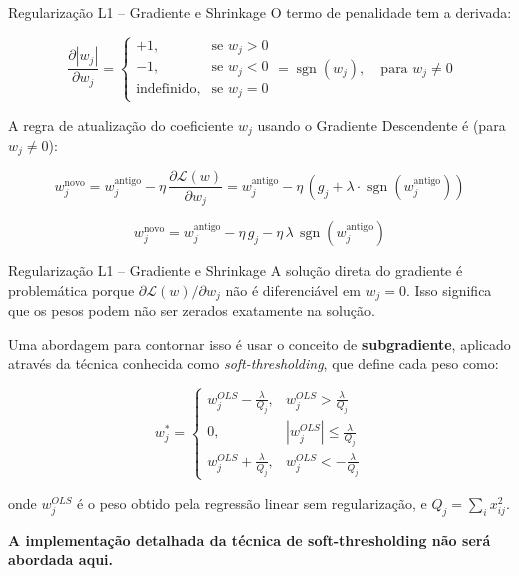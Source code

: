 \documentclass{beamer}
\begin{document}
\begin{frame}{Regularização L1 – Gradiente e Shrinkage}
O termo de penalidade tem a derivada:

\begin{equation}
\frac{\partial |w_j|}{\partial w_j} =
\begin{cases}
+1, & \text{se } w_j > 0 \\
-1, & \text{se } w_j < 0 \\
\text{indefinido}, & \text{se } w_j = 0
\end{cases}
= \operatorname{sgn}(w_j), \quad \text{para } w_j \ne 0
\end{equation}

A regra de atualização do coeficiente $w_j$ usando o Gradiente Descendente é (para $w_j \ne 0$):

\begin{equation}
w_j^{\text{novo}} = w_j^{\text{antigo}} - \eta \, \frac{\partial \mathcal{L}(w)}{\partial w_j}
= w_j^{\text{antigo}} - \eta \, (g_j + \lambda \cdot \operatorname{sgn}(w_j^{\text{antigo}}))
\end{equation}

\begin{equation}
w_j^{\text{novo}} = w_j^{\text{antigo}} - \eta \, g_j - \eta \, \lambda \, \operatorname{sgn}(w_j^{\text{antigo}})
\end{equation}
\end{frame}


\begin{frame}{Regularização L1 – Gradiente e Shrinkage}
A solução direta do gradiente é problemática porque 
$\partial \mathcal{L}(w)/\partial w_j$ não é diferenciável em $w_j = 0$. 
Isso significa que os pesos podem não ser zerados exatamente na solução.  

Uma abordagem para contornar isso é usar o conceito de \textbf{subgradiente}, aplicado através da técnica conhecida como \textit{soft-thresholding}, que define cada peso como:

\[
w_j^* =
\begin{cases}
w_j^{OLS} - \frac{\lambda}{Q_j}, & w_j^{OLS} > \frac{\lambda}{Q_j} \\
0, & |w_j^{OLS}| \le \frac{\lambda}{Q_j} \\
w_j^{OLS} + \frac{\lambda}{Q_j}, & w_j^{OLS} < -\frac{\lambda}{Q_j}
\end{cases}
\]

onde $w_j^{OLS}$ é o peso obtido pela regressão linear sem regularização, 
e $Q_j = \sum_i x_{ij}^2$.  

\textbf{A implementação detalhada da técnica de soft-thresholding não será abordada aqui.}
\end{frame}
\end{document}
